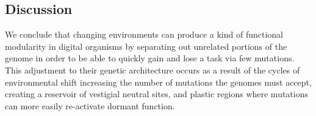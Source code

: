 \subsection{Discussion}

We conclude that changing environments can produce a kind of functional modularity in digital organisms by separating out unrelated portions of the genome in order to be able to quickly gain and lose a task via few mutations. This adjustment to their genetic architecture occurs as a result of the cycles of environmental shift increasing the number of mutations the genomes must accept, creating a reservoir of vestigial neutral sites, and plastic regions where mutations can more easily re-activate dormant function.